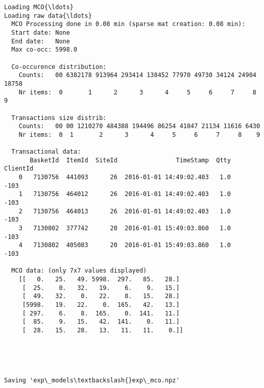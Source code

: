 \documentclass[11pt]{article}
\begin{document}
    \begin{Verbatim}[commandchars=\\\{\},fontsize=\footnotesize]
		Loading MCO{\ldots}
Loading raw data{\ldots}
  MCO Processing done in 0.08 min (sparse mat creation: 0.08 min):
  Start date: None
  End date:   None
  Max co-occ: 5998.0

  Co-occurence distribution:
    Counts:   00 6382178 913964 293414 138452 77970 49730 34124 24904 18758
    Nr items:  0       1      2      3      4     5     6     7     8     9

  Transactions size distrib:
    Counts:   00 00 1210270 484388 194496 86254 41847 21134 11616 6430
    Nr items:  0  1       2      3      4     5     6     7     8    9

  Transactional data:
       BasketId  ItemId  SiteId                TimeStamp  Qtty  ClientId
    0   7130756  441093      26  2016-01-01 14:49:02.403   1.0      -103
    1   7130756  464012      26  2016-01-01 14:49:02.403   1.0      -103
    2   7130756  464013      26  2016-01-01 14:49:02.403   1.0      -103
    3   7130802  377742      20  2016-01-01 15:49:03.860   1.0      -103
    4   7130802  405083      20  2016-01-01 15:49:03.860   1.0      -103

  MCO data: (only 7x7 values displayed)
    [[   0.   25.   49. 5998.  297.   85.   28.]
     [  25.    0.   32.   19.    6.    9.   15.]
     [  49.   32.    0.   22.    8.   15.   28.]
     [5998.   19.   22.    0.  165.   42.   13.]
     [ 297.    6.    8.  165.    0.  141.   11.]
     [  85.    9.   15.   42.  141.    0.   11.]
     [  28.   15.   28.   13.   11.   11.    0.]]

    \end{Verbatim}

		
    \begin{center}
    \end{center}
    { \hspace*{\fill} \\}
    
	
		
    \begin{center}
    \end{center}
    { \hspace*{\fill} \\}
    
	
    \begin{Verbatim}[commandchars=\\\{\},fontsize=\footnotesize]
		Saving 'exp\_models\textbackslash{}exp\_mco.npz'

    \end{Verbatim}
\end{document}
